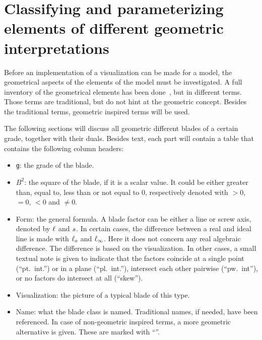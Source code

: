 \section{Classifying and parameterizing elements of different geometric interpretations}
\label{ch:research}

Before an implementation of a visualization can be made for a model, the geometrical aspects of the elements of the model must be investigated.  A full inventory of the geometrical elements has been done~\cite[Chapter 3]{Pottmann}, but in different terms.  Those terms are traditional, but do not hint at the geometric concept.  Besides the traditional terms, geometric inspired terms will be used.  

The following sections will discuss all geometric different blades of a certain grade, together with their duals.  Besides text, each part will contain a table that contains the following column headers:
\begin{itemize}
  \item \texttt{g}: the grade of the blade.
  \item $B^2$: the square of the blade, if it is a scalar value.  It could be either greater than, equal to, less than or not equal to 0, respectively denoted with $> 0$, $= 0$, $< 0$ and $\not= 0$.
  \item Form: the general formula.  A blade factor can be either a line or screw axis, denoted by $\ell$ and $s$.  In certain cases, the difference between a real and ideal line is made with $\ell_o$ and $\ell_\infty$.  Here it does not concern any real algebraic difference.  The difference is based on the visualization.  In other cases, a small textual note is given to indicate that the factors coincide at a single point (``pt.\ int.'') or in a plane (``pl.\ int.''), intersect each other pairwise (``pw.\ int''), or no factors do intersect at all (``skew'').
  \item Visualization: the picture of a typical blade of this type.
  \item Name: what the blade class is named.  Traditional names, if needed, have been referenced.  In case of non-geometric inspired terms, a more geometric alternative is given.  These are marked with ``\newterm''.
\end{itemize}


